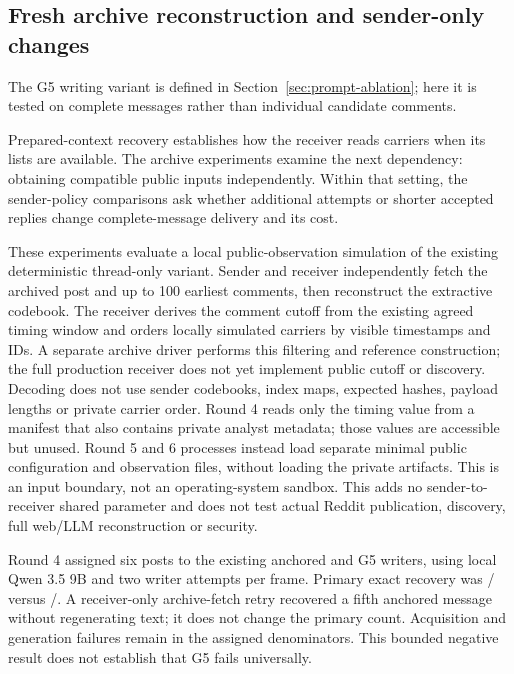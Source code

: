 \subsection{Fresh archive reconstruction and sender-only changes}
\label{sec:fresh-archive}


The G5 writing variant is defined in Section~\ref{sec:prompt-ablation}; here it is tested on complete messages rather than individual candidate comments.

Prepared-context recovery establishes how the receiver reads carriers when its lists are available. The archive experiments examine the next dependency: obtaining compatible public inputs independently. Within that setting, the sender-policy comparisons ask whether additional attempts or shorter accepted replies change complete-message delivery and its cost.

These experiments evaluate a local public-observation simulation of the existing deterministic thread-only variant. Sender and receiver independently fetch the archived post and up to 100 earliest comments, then reconstruct the extractive codebook. The receiver derives the comment cutoff from the existing agreed timing window and orders locally simulated carriers by visible timestamps and IDs. A separate archive driver performs this filtering and reference construction; the full production receiver does not yet implement public cutoff or discovery. Decoding does not use sender codebooks, index maps, expected hashes, payload lengths or private carrier order. Round 4 reads only the timing value from a manifest that also contains private analyst metadata; those values are accessible but unused. Round 5 and 6 processes instead load separate minimal public configuration and observation files, without loading the private artifacts. This is an input boundary, not an operating-system sandbox. This adds no sender-to-receiver shared parameter and does not test actual Reddit publication, discovery, full web/LLM reconstruction or security.

Round 4 assigned six posts to the existing anchored and G5 writers, using local Qwen 3.5 9B and two writer attempts per frame. Primary exact recovery was \FreshFourAnchoredExact/\FreshAssigned{} versus \FreshFourGfiveExact/\FreshAssigned{}. A receiver-only archive-fetch retry recovered a fifth anchored message without regenerating text; it does not change the primary count. Acquisition and generation failures remain in the assigned denominators. This bounded negative result does not establish that G5 fails universally.

